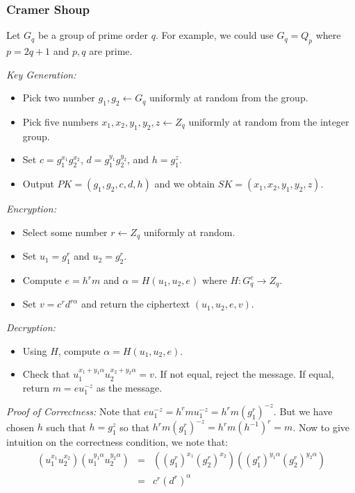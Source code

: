 \documentclass[psamsfonts]{amsart}
\begin{document}
\subsubsection{Cramer Shoup}

Let $G_q$ be a group of prime order $q$. For example, we could use $G_q = Q_p$ where $p = 2q+1$ and $p,q$ are prime.

\emph{Key Generation:}
\begin{itemize}
  \item Pick two number $g_1, g_2 \leftarrow G_q$ uniformly at random from the group.
  \item Pick five numbers $x_1, x_2, y_1, y_2, z \leftarrow Z_q$ uniformly at random from the integer group.
  \item Set $c = g_1^{x_1} g_2^{x_2}$, $d = g_1^{y_1} g_2^{y_2}$, and $h = g_1^z$.
  \item Output $PK = (g_1, g_2, c, d, h)$ and we obtain $SK = (x_1, x_2, y_1, y_2, z)$.
\end{itemize}

\emph{Encryption:}
\begin{itemize}
  \item Select some number $r \leftarrow Z_q$ uniformly at random.
  \item Set $u_1 = g_1^{r}$ and $u_2 = g_2^{r}$.
  \item Compute $e = h^r m$ and $\alpha = H(u_1, u_2, e)$ where $H: G_q^{e} \to Z_q$.
  \item Set $v = c^r d^{r \alpha}$ and return the ciphertext $(u_1, u_2, e, v)$.
\end{itemize}

\emph{Decryption:}
\begin{itemize}
  \item Using $H$, compute $\alpha = H(u_1, u_2, e)$.
  \item Check that $u_1^{x_1 + y_1 \alpha} u_2^{x_2 + y_2 \alpha} = v$. If not equal, reject the message. If equal, return $m = e u_1^{-z}$ as the message.
\end{itemize}

\emph{Proof of Correctness:} Note that $e u_1^{-z} = h^r m u_1^{-z} = h^r m (g_1^{r})^{-z}$. But we have chosen $h$ such that $h = g_1^z$ so that $h^r m (g_1^{r})^{-z} = h^r m (h^{-1})^r = m$. Now to give intuition on the correctness condition, we note that:
\begin{eqnarray}
  (u_1^{x_1} u_2^{x_2})(u_1^{y_1 \alpha} u_2^{y_2 \alpha}) &=& ((g_1^{r})^{x_1}(g_2^{r})^{x_2})((g_1^{r})^{y_1 \alpha} (g_2^{r})^{y_2 \alpha}) \\
                                                           &=& c^r (d^r)^\alpha
\end{eqnarray}
\end{document}
